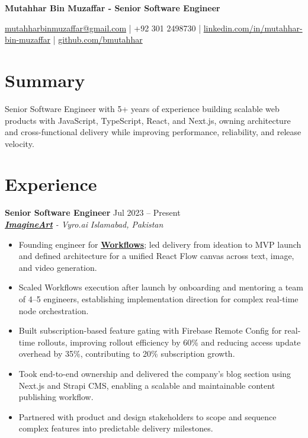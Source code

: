\documentclass[9pt,letterpaper]{article}
\newcommand{\resumeHeader}[1]{%
  \begin{center}
    \vspace{2pt}
    {\fontsize{18pt}{20pt}\selectfont\bfseries #1\par}
    \vspace{4pt}
  \end{center}
}
\newcommand{\role}[4]{\textbf{#1} \hfill #2 \\
\textit{#3} \hfill \textit{#4}\\[-4pt]}
\begin{document}
\resumeHeader{Mutahhar Bin Muzaffar - Senior Software Engineer}
\begin{center}
\fontsize{9pt}{11pt}\selectfont
\href{mailto:mutahharbinmuzaffar@gmail.com}{mutahharbinmuzaffar@gmail.com} \;|\; +92 301 2498730 \;|\;
\href{https://www.linkedin.com/in/mutahhar-bin-muzaffar}{linkedin.com/in/mutahhar-bin-muzaffar} \;|\;
\href{https://github.com/bmutahhar}{github.com/bmutahhar}
\end{center}

\section*{Summary}
Senior Software Engineer with 5+ years of experience building scalable web products with JavaScript, TypeScript, React, and Next.js, owning architecture and cross-functional delivery while improving performance, reliability, and release velocity.

\section*{Experience}
\role{Senior Software Engineer}{Jul 2023 -- Present}{\href{https://www.imagine.art/}{\textbf{\underline{ImagineArt}}} - Vyro.ai}{Islamabad, Pakistan}
\begin{itemize}[leftmargin=*, itemsep=0pt, topsep=0pt, partopsep=0pt, parsep=0pt, after=\vspace{2pt}]
  \item Founding engineer for \href{https://www.imagine.art/flow}{\textbf{\underline{Workflows}}}; led delivery from ideation to MVP launch and defined architecture for a unified React Flow canvas across text, image, and video generation.
  \item Scaled Workflows execution after launch by onboarding and mentoring a team of 4--5 engineers, establishing implementation direction for complex real-time node orchestration.
  \item Built subscription-based feature gating with Firebase Remote Config for real-time rollouts, improving rollout efficiency by 60\% and reducing access update overhead by 35\%, contributing to 20\% subscription growth.
  \item Took end-to-end ownership and delivered the company's blog section using Next.js and Strapi CMS, enabling a scalable and maintainable content publishing workflow.
  \item Partnered with product and design stakeholders to scope and sequence complex features into predictable delivery milestones.

\end{itemize}
\end{document}
